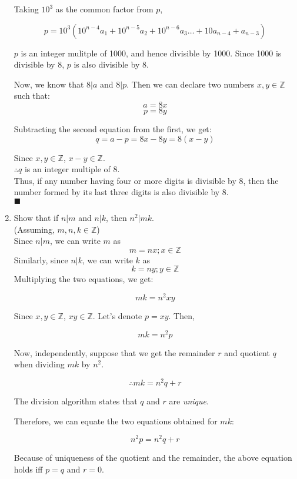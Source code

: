 \documentclass[a4paper,12pt]{article} %
\begin{document}
\begin{enumerate}
	Taking $10^3$ as the common factor from $p$,

	$$ p = 10^3 (10^{n - 4} a_1 + 10^{n - 5} a_2 + 10^{n - 6} a_3 \dots + 10 a_{n - 4} + a_{n - 3}) $$

	$p$ is an integer mulitple of 1000, and hence divisible by 1000. Since 1000 is divisible by 8, $p$ is also divisible by 8.

	Now, we know that $8 | a$ and $8 | p$. Then we can declare two numbers $x, y \in \mathbb{Z}$ such that:
	$$ a = 8x $$
	$$ p = 8y $$
	
	Subtracting the second equation from the first, we get:
	$$ q = a - p = 8x - 8y = 8(x - y) $$

	Since $x, y \in \mathbb{Z}$, $x - y \in \mathbb{Z}$.\\
	$\therefore q$ is an integer multiple of 8.\\

	Thus, if any number having four or more digits is divisible by 8, then the number formed by its last three digits is also divisible by 8.\\
	$\blacksquare$\\

\item Show that if $n | m$ and $n | k$, then $n^2 | mk$.\\
	(Assuming, $m, n, k \in \mathbb{Z}$)\\
	Since $n | m$, we can write $m$ as\\
	$$ m = nx; x \in \mathbb{Z}$$
	Similarly, since $n | k$, we can write $k$ as\\
	$$ k = ny; y \in \mathbb{Z}$$
	Multiplying the two equations, we get:

	$$ mk = n^{2}xy$$

	Since $x, y \in \mathbb{Z}$, $xy \in \mathbb{Z}$. Let's denote $p = xy$. Then,

	$$mk = n^{2}p$$

	Now, independently, suppose that we get the remainder $r$ and quotient $q$ when dividing $mk$ by $n^{2}$.

	$$\therefore mk = n^{2}q + r$$

	The division algorithm states that $q$ and $r$ are \textit{unique}.

	Therefore, we can equate the two equations obtained for $mk$:

	$$n^{2}p = n^{2}q + r$$

	Because of uniqueness of the quotient and the remainder, the above equation holds iff $p = q$ and $r = 0$.


\end{enumerate}
\end{document}
